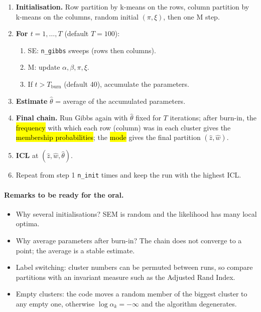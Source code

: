 \begin{enumerate}
  \item \textbf{Initialisation.} Row partition by k-means on the rows,
  column partition by k-means on the columns, random initial $(\pi,\xi)$,
  then one M step.
  \item \textbf{For $t=1,\ldots,T$} (default $T=100$):
  \begin{enumerate}
    \item SE: \texttt{n\_gibbs} sweeps (rows then columns).
    \item M: update $\alpha,\beta,\pi,\xi$.
    \item If $t>T_{\text{burn}}$ (default 40), accumulate the parameters.
  \end{enumerate}
  \item \textbf{Estimate} $\hat\theta$ = average of the accumulated parameters.
  \item \textbf{Final chain.} Run Gibbs again with $\hat\theta$ fixed for
  $T$ iterations; after burn-in, the \hl{frequency} with which each row
  (column) was in each cluster gives the \hl{membership probabilities};
  the \hl{mode} gives the final partition $(\hat z,\hat w)$.
  \item \textbf{ICL} at $(\hat z,\hat w,\hat\theta)$.
  \item Repeat from step 1 \texttt{n\_init} times and keep the run with
  the highest ICL.
\end{enumerate}

\paragraph{Remarks to be ready for the oral.}
\begin{itemize}
  \item Why several initialisations? SEM is random and the likelihood has
  many local optima.
  \item Why average parameters after burn-in? The chain does not converge to a
  point; the average is a stable estimate.
  \item Label switching: cluster numbers can be permuted between runs, so
  compare partitions with an invariant measure such as the Adjusted Rand Index.
  \item Empty clusters: the code moves a random member of the biggest cluster
  to any empty one, otherwise $\log\alpha_k=-\infty$ and the algorithm
  degenerates.
\end{itemize}

